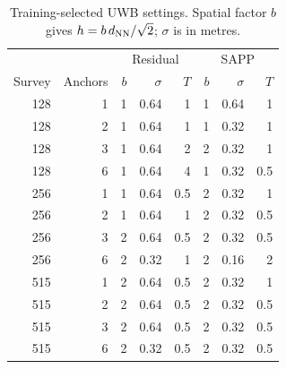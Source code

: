 \begin{table}[ht]
\centering\small
\caption{Training-selected UWB settings. Spatial factor $b$ gives $h=b\,d_{\rm NN}/\sqrt2$; $\sigma$ is in metres.}
\label{tab:uwbselected}
\begin{tabular}{rr rrr rrr}
\toprule
 & & \multicolumn{3}{c}{Residual} & \multicolumn{3}{c}{SAPP}\\
Survey & Anchors & $b$ & $\sigma$ & $T$ & $b$ & $\sigma$ & $T$\\\midrule
128 & 1 & 1 & 0.64 & 1 & 1 & 0.64 & 1 \\
128 & 2 & 1 & 0.64 & 1 & 1 & 0.32 & 1 \\
128 & 3 & 1 & 0.64 & 2 & 2 & 0.32 & 1 \\
128 & 6 & 1 & 0.64 & 4 & 1 & 0.32 & 0.5 \\
256 & 1 & 1 & 0.64 & 0.5 & 2 & 0.32 & 1 \\
256 & 2 & 1 & 0.64 & 1 & 2 & 0.32 & 0.5 \\
256 & 3 & 2 & 0.64 & 0.5 & 2 & 0.32 & 0.5 \\
256 & 6 & 2 & 0.32 & 1 & 2 & 0.16 & 2 \\
515 & 1 & 2 & 0.64 & 0.5 & 2 & 0.32 & 1 \\
515 & 2 & 2 & 0.64 & 0.5 & 2 & 0.32 & 0.5 \\
515 & 3 & 2 & 0.64 & 0.5 & 2 & 0.32 & 0.5 \\
515 & 6 & 2 & 0.32 & 0.5 & 2 & 0.32 & 0.5 \\
\bottomrule
\end{tabular}
\end{table}
